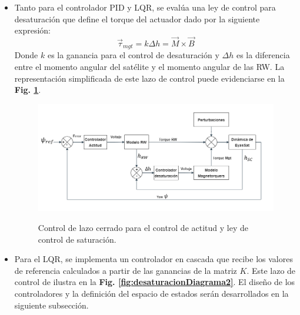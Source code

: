 \begin{itemize}
	 \item Tanto para el controlador PID y LQR, se evalúa una ley de control para desaturación que define el torque del actuador dado por la siguiente expresión:
	 	\begin{equation}\label{eq:ley_de_control_sat}
	 		\vec{\tau}_{mgt} = k\Delta h =\vec{M}\times\vec{B} 
	 	\end{equation} 
	 Donde $k$ es la ganancia para el control de desaturación y $\Delta h$ es la diferencia entre el momento angular del satélite y el momento angular de las RW. La representación simplificada de este lazo de control puede evidenciarse en la \textbf{Fig. \ref{fig:desaturacionDiagrama}}.
	 
	 \begin{figure}[!ht]
	 	\begin{center}
	 		\includegraphics[scale=0.55]{imagenes/controladores/Diagrama_controlador.PNG}\\
	 	\end{center}
	 	\caption{Control de lazo cerrado para el control de actitud y ley de control de saturación.}
	 	\label{fig:desaturacionDiagrama}	 	
	 \end{figure}
	 
	 \item Para el LQR, se implementa un controlador en cascada que recibe los valores de referencia calculados a partir de las ganancias de la matriz $K$. Este lazo de control de ilustra en la \textbf{Fig. \ref{fig:desaturacionDiagrama2}}. El diseño de los controladores y la definición del espacio de estados serán desarrollados en la siguiente subsección.  
	 

\end{itemize}
